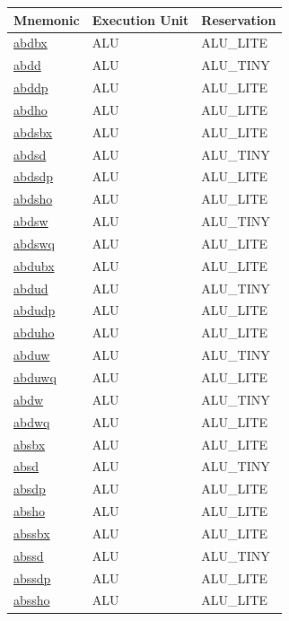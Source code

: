 \label{sec:instructions_index}
\begin{small}
\begin{longtable}[l]{l l l}
\textbf{Mnemonic} & \textbf{Execution Unit} & \textbf{Reservation} \\
\endhead
\hyperlink{lvx.abdbx}{abdbx} & ALU & ALU\_LITE \\ 
\hyperlink{lvx.abdd}{abdd} & ALU & ALU\_TINY \\ 
\hyperlink{lvx.abddp}{abddp} & ALU & ALU\_LITE \\ 
\hyperlink{lvx.abdho}{abdho} & ALU & ALU\_LITE \\ 
\hyperlink{lvx.abdsbx}{abdsbx} & ALU & ALU\_LITE \\ 
\hyperlink{lvx.abdsd}{abdsd} & ALU & ALU\_TINY \\ 
\hyperlink{lvx.abdsdp}{abdsdp} & ALU & ALU\_LITE \\ 
\hyperlink{lvx.abdsho}{abdsho} & ALU & ALU\_LITE \\ 
\hyperlink{lvx.abdsw}{abdsw} & ALU & ALU\_TINY \\ 
\hyperlink{lvx.abdswq}{abdswq} & ALU & ALU\_LITE \\ 
\hyperlink{lvx.abdubx}{abdubx} & ALU & ALU\_LITE \\ 
\hyperlink{lvx.abdud}{abdud} & ALU & ALU\_TINY \\ 
\hyperlink{lvx.abdudp}{abdudp} & ALU & ALU\_LITE \\ 
\hyperlink{lvx.abduho}{abduho} & ALU & ALU\_LITE \\ 
\hyperlink{lvx.abduw}{abduw} & ALU & ALU\_TINY \\ 
\hyperlink{lvx.abduwq}{abduwq} & ALU & ALU\_LITE \\ 
\hyperlink{lvx.abdw}{abdw} & ALU & ALU\_TINY \\ 
\hyperlink{lvx.abdwq}{abdwq} & ALU & ALU\_LITE \\ 
\hyperlink{lvx.absbx}{absbx} & ALU & ALU\_LITE \\ 
\hyperlink{lvx.absd}{absd} & ALU & ALU\_TINY \\ 
\hyperlink{lvx.absdp}{absdp} & ALU & ALU\_LITE \\ 
\hyperlink{lvx.absho}{absho} & ALU & ALU\_LITE \\ 
\hyperlink{lvx.abssbx}{abssbx} & ALU & ALU\_LITE \\ 
\hyperlink{lvx.abssd}{abssd} & ALU & ALU\_TINY \\ 
\hyperlink{lvx.abssdp}{abssdp} & ALU & ALU\_LITE \\ 
\hyperlink{lvx.abssho}{abssho} & ALU & ALU\_LITE \\ 

\end{longtable}
\end{small}
